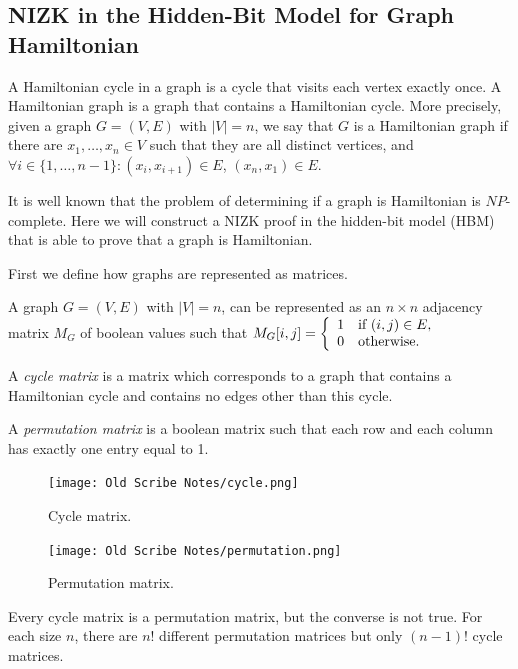 \documentclass[12pt]{tufte-book}
\begin{document}
\subsection{NIZK in the Hidden-Bit Model for  Graph Hamiltonian}

\begin{definition}
A Hamiltonian cycle in a graph is a cycle that visits each vertex exactly once. A Hamiltonian graph is a graph that contains a Hamiltonian cycle. More precisely, given a graph
$G=(V,E)$ with $|V|=n$, we say that $G$ is a Hamiltonian graph if there are
$x_1,\ldots,x_n\in V$ such that they are all distinct vertices, and $\forall i\in\{1,\ldots,n-1\} : (x_i,x_{i+1})\in E$,
$(x_n,x_1)\in E$.
\end{definition}


It is well known that the problem of determining if a graph is Hamiltonian is $NP$-complete.
Here we will construct a NIZK proof in the hidden-bit model (HBM) that is able to prove
that a graph is Hamiltonian.

First we define how graphs are represented as matrices.

\begin{definition}
A graph $G=(V,E)$ with $|V|=n$, can be represented as an $n\times n$ adjacency matrix $M_G$
of boolean values such that
$M_G[i,j]=\left\{
\begin{array}{l l}
1 & \text{if $(i,j)\in E$,} \\
0 & \text{otherwise.}
\end{array}
\right.$

A \emph{cycle matrix} is a matrix which corresponds to a graph that contains a Hamiltonian cycle and
contains no edges other than this cycle.

A \emph{permutation matrix} is a boolean matrix such that each row and each column has exactly one
entry equal to 1.
\end{definition}

\begin{figure}[ht]
	\centering
		\texttt{[image: Old Scribe Notes/cycle.png]}
	\caption{Cycle matrix.}
	\label{fig:cycle}
\end{figure}

\begin{figure}[ht]
	\centering
		\texttt{[image: Old Scribe Notes/permutation.png]}
	\caption{Permutation matrix.}
	\label{fig:permutation}
\end{figure}

Every cycle matrix is a permutation matrix, but the converse is not true.
For each size $n$, there are $n!$ different permutation matrices but
only $(n-1)!$ cycle matrices.
\end{document}
